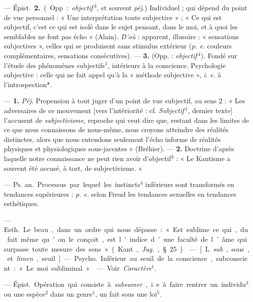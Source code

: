 \begin{itemize}[leftmargin=1cm, label=, itemsep=1pt]
— \si{Épist.} {\bf 2.} (Opp. : {\it objectif}$\,^3$, et souvent {\it péj.})
Individuel ; qui dépend du point de vue personnel : « Une interprétation
toute subjective » ; « Ce qui est subjectif, c’est ce qui est isolé dans le
sujet pensant, dans le moi, et à quoi les semblables ne font pas écho
» (Alain). {\it D'où} : apparent, illusoire : « sensations subjectives »,
celles qui se produisent sans stimulus extérieur ({\it p. e.} couleurs
complémentaires, sensations consécutives). — {\bf 3.} (Opp. :
{\it objectif}$\,^4$). Fondé sur l'étude des phénomènes subjectifs$^1$,
intérieurs à la conscience. Psychologie subjective : celle qui ne fait appel
qu’à la « méthode subjective », {\it i. e.} à l’introspection*.

 —  {\bf 1.} {\it Péj.} Propension à tout
juger d’un point de vue subjectif, au sens 2 : « Les adversaires de ce
mouvement [vers l’intériorité : cf. {\it Subjectif}$\,^1$, dernier texte]
l’accusent de {\it subjectivisme}, reproche qui veut dire que, restant dans
les limites de ce que nous connaissons de nous-même, nous croyons atteindre
des réalités distinctes, alors que nous entendons seulement l’écho informe de
réalités physiques et physiologiques sous-jacentes » (Bréhier). —  {\bf 2.}
Doctrine d’après laquelle notre connaissance ne peut rien avoir
d’objectif$^3$ : « Le Kantisme a souvent été accusé, à tort, de
subjectivisme. »

 — \si{Ps. an.} Processus par lequel les instincts$^4$
inférieurs sont transformés en tendances supérieures : {\it p. e.} selon
Freud les tendances sexuelles en tendances esthétiques.

 — \si{Esth.} Le beau, dans un ordre qui nous dépasse : « Est
sublime ce qui, du fait même qu'on le conçoit, est l'indice d’une faculté de
l’âme qui surpasse toute mesure des sens » (Kant, {\it Jug.}, § 25).

 — [L. {\it sub}, sous, et {\it limen}, seuil]. — \si{Psycho.}
Inférieur au seuil de la conscience, subconscient : « Le moi subliminal. »

 — Voir {\it Caractère}$^1$.

 — \si{Épist.} Opération qui consiste à {\it subsumer},
i. e. à faire rentrer un individu$^3$ ou une espèce$^2$ dans un
genre$^1$, un fait sous une loi$^5$.


\end{itemize}
